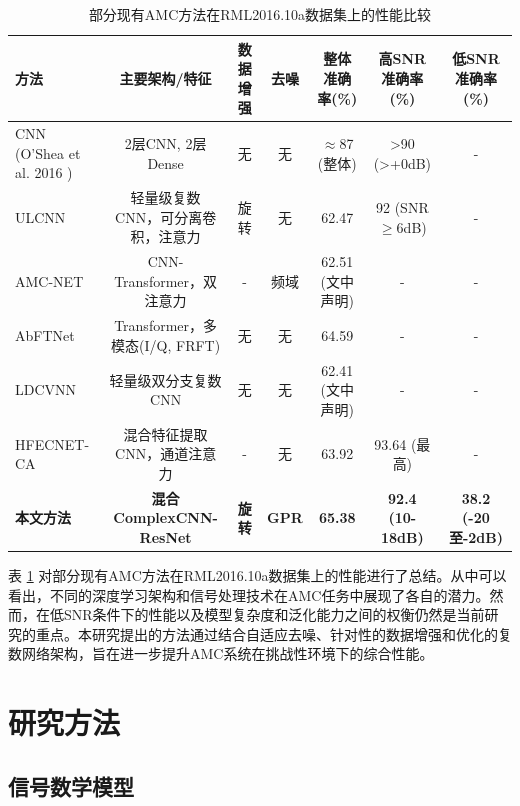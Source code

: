 \documentclass[conference]{IEEEtran}
\begin{document}
\begin{table}[htbp]
\centering
\caption{部分现有AMC方法在RML2016.10a数据集上的性能比较}
\label{tab:sota_comparison_related_work}
\begin{tabular}{@{}lcccccc@{}}
\toprule
方法                          & 主要架构/特征                     & 数据增强 & 去噪 & 整体准确率(\%) & 高SNR准确率(\%) & 低SNR准确率(\%) \\
\midrule
CNN (O'Shea et al. 2016 \cite{oshea2016convolutional}) & 2层CNN, 2层Dense                 & 无       & 无   & $\approx$87 (整体) & >90 (>+0dB) & - \\
ULCNN \cite{b1}               & 轻量级复数CNN，可分离卷积，注意力 & 旋转     & 无   & 62.47 \cite{b1}\cite{[23_MISSING]} & 92 (SNR$\ge$6dB) \cite{b1} & - \\ %
AMC-NET \cite{b2}             & CNN-Transformer，双注意力         & -        & 频域 & 62.51 (文中声明) & - & - \\
AbFTNet \cite{b3}             & Transformer，多模态(I/Q, FRFT)    & 无       & 无   & 64.59 \cite{[38_MISSING]}\cite{[41_MISSING]} & - & - \\
LDCVNN \cite{b4}              & 轻量级双分支复数CNN                & 无       & 无   & 62.41 (文中声明) & - & - \\
HFECNET-CA \cite{b5}          & 混合特征提取CNN，通道注意力         & -        & 无   & 63.92 \cite{[62_MISSING]} & 93.64 (最高) & - \\
\textbf{本文方法}             & \textbf{混合ComplexCNN-ResNet}    & \textbf{旋转} & \textbf{GPR} & \textbf{65.38} & \textbf{92.4 (10-18dB)} & \textbf{38.2 (-20至-2dB)} \\
\bottomrule
\end{tabular}
\end{table}
表 \ref{tab:sota_comparison_related_work} 对部分现有AMC方法在RML2016.10a数据集上的性能进行了总结。从中可以看出，不同的深度学习架构和信号处理技术在AMC任务中展现了各自的潜力。然而，在低SNR条件下的性能以及模型复杂度和泛化能力之间的权衡仍然是当前研究的重点。本研究提出的方法通过结合自适应去噪、针对性的数据增强和优化的复数网络架构，旨在进一步提升AMC系统在挑战性环境下的综合性能。

\section{研究方法}

\subsection{信号数学模型}
\end{document}
